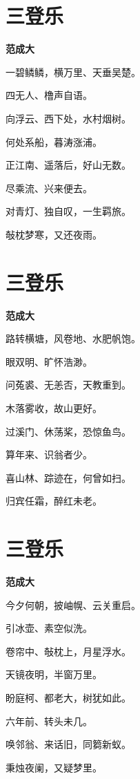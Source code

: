 \documentclass[12pt,a4paper]{ctexbook}
\begin{document}
\section{三登乐}
\textbf{范成大}\par\vspace{0.5em}
一碧鳞鳞，横万里、天垂吴楚。\par
四无人、橹声自语。\par
向浮云、西下处，水村烟树。\par
何处系船，暮涛涨浦。\par
正江南、遥落后，好山无数。\par
尽乘流、兴来便去。\par
对青灯、独自叹，一生羁旅。\par
敧枕梦寒，又还夜雨。\par

\section{三登乐}
\textbf{范成大}\par\vspace{0.5em}
路转横塘，风卷地、水肥帆饱。\par
眼双明、旷怀浩渺。\par
问菟裘、无恙否，天教重到。\par
木落雾收，故山更好。\par
过溪门、休荡桨，恐惊鱼鸟。\par
算年来、识翁者少。\par
喜山林、踪迹在，何曾如扫。\par
归宾任霜，醉红未老。\par

\section{三登乐}
\textbf{范成大}\par\vspace{0.5em}
今夕何朝，披岫幌、云关重启。\par
引冰壶、素空似洗。\par
卷帘中、敧枕上，月星浮水。\par
天镜夜明，半窗万里。\par
盼庭柯、都老大，树犹如此。\par
六年前、转头未几。\par
唤邻翁、来话旧，同篘新蚁。\par
秉烛夜阑，又疑梦里。\par
\end{document}
